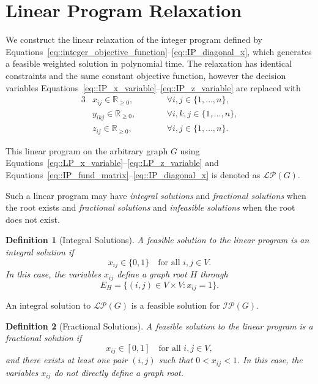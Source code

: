 \documentclass[11pt]{report}
\newtheorem{definition}{Definition}[section]
\begin{document}
\section{Linear Program Relaxation} \label{sec::linear_program_relaxation}

We construct the linear relaxation of the integer program defined by Equations~\eqref{eq::integer_objective_function}--\eqref{eq::IP_diagonal_x}, which generates a feasible weighted solution in polynomial time. The relaxation has identical constraints and the same constant objective function, however the decision variables Equations~\eqref{eq::IP_x_variable}--\eqref{eq::IP_z_variable} are replaced with
\begin{alignat}{3}
& x_{ij} \in  \mathbb{R}_{\geq 0}, 
&&\qquad \forall i,j \in \{1, \dots, n\}, \label{eq::LP_x_variable} \\
& y_{ikj} \in \mathbb{R}_{\geq 0}, 
&&\qquad \forall i,k,j \in \{1, \dots, n\}, \label{eq::LP_y_variable} \\
& z_{ij} \in \mathbb{R}_{\geq 0}, 
&&\qquad \forall i,j \in \{1, \dots, n\} \label{eq::LP_z_variable}. 
\end{alignat} 

This linear program on the arbitrary graph $G$ using Equations~\eqref{eq::LP_x_variable}--\eqref{eq::LP_z_variable} and Equations~\eqref{eq::IP_fund_matrix}--\eqref{eq::IP_diagonal_x} is denoted as $\mathcal{LP}(G)$. 

Such a linear program may have \emph{integral solutions} and \emph{fractional solutions} when the root exists and \emph{fractional solutions} and \emph{infeasible solutions} when the root does not exist. 

\begin{definition}[Integral Solutions]
  A feasible solution to the linear program is an \emph{integral solution} if
  \[
  x_{ij} \in \{0,1\} \quad \text{for all } i,j \in V.
  \]
  In this case, the variables $x_{ij}$ define a graph root $H$ through
  \[
  E_H = \{(i,j) \in V \times V : x_{ij}=1\}.
  \]
\end{definition}

An integral solution to $\mathcal{LP}(G)$ is a feasible solution for $\mathcal{IP}(G)$. 

\begin{definition}[Fractional Solutions]
  A feasible solution to the linear program is a \emph{fractional solution}
  if
  \[
  x_{ij} \in [0,1] \quad \text{for all } i,j \in V,
  \]
  and there exists at least one pair $(i,j)$ such that $0 < x_{ij} < 1$. In this case, the variables $x_{ij}$ do not directly define a graph root.
\end{definition}
\end{document}
